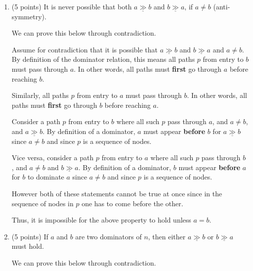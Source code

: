 \documentclass[12pt]{article}
\newcommand{\dom}{\underline{\gg}}
\begin{document}
\begin{enumerate}
\begin{enumerate}
    \item (5 points) It is never possible that both $a \dom b$ and $b \dom
    a$, if $a \neq b$ (anti-symmetry).
    \begin{mdframed}

       We can prove this below through contradiction.
        \vspace{0.5em}
        
       Assume for contradiction that it is possible that $a \dom b $ and $ b \dom a$ and $ a \neq b$. By definition of the dominator relation, this means all paths $p$ from entry to $b$ must pass through $a$. In other words, all paths must \textbf{first} go through $a$ before reaching $b$.
       \vspace{0.5em}

       Similarly, all paths $p$ from entry to $a$ must pass through $b$. In other words, all paths must \textbf{first} go through $b$ before reaching $a$.

\vspace{0.5em}
    Consider a path $p$ from entry to $b$ where all such $p$ pass through $a$, and  $a \ne b$, and  $a \dom b$. By definition of a dominator, $a$ must appear \textbf{before} $b$ for $a \dom b$ since $a \ne b$ and since $p$ is a sequence of nodes.
\vspace{0.5em}

    Vice versa, consider a path $p$ from entry to $a$ where all such $p$ pass through $b$ , and  $a \ne b$ and $b \dom a$. By definition of a dominator, $b$ must appear \textbf{before} $a$ for $b$ to dominate $a$ since $a \ne b$ and since $p$ is a sequence of nodes.
    
\vspace{0.5em}

       However both of these statements cannot be true at once since in the sequence of nodes in $p$ one has to come before the other.

       Thus, it is impossible for the above property to hold unless $a = b$.
      
    \end{mdframed}

    \item (5 points) If $a$ and $b$ are two dominators of $n$, then either
    $a \dom b$ or $b \dom a$ must hold.
    \begin{mdframed}
      We can prove this below through contradiction.
      \vspace{0.5em}
      

\end{mdframed}
\end{enumerate}
\end{enumerate}
\end{document}
